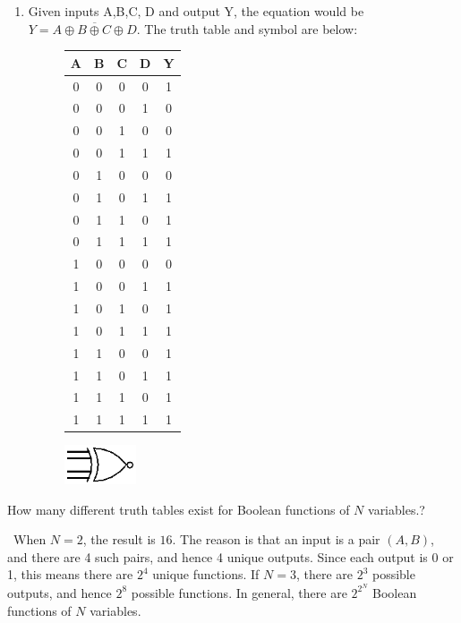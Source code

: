 \documentclass[12pt]{article}
\newenvironment{ex}[2][Exercise]{\begin{trivlist}
		\item[\hskip \labelsep {\bfseries #1}\hskip \labelsep {\bfseries #2.}]}{\end{trivlist}}
\newenvironment{sol}[1][Solution]{\begin{trivlist}
		\item[\hskip \labelsep {\bfseries #1:}]}{\end{trivlist}}
\begin{document}
\begin{sol}
\begin{enumerate}[label=(\alph*)]
		\item Given inputs A,B,C, D and output Y, the equation would be $Y=\overline{A\oplus B\oplus C \oplus D}$. The truth table and symbol are below:
		\begin{figure}[h]
			\centering
			\begin{tabular}{|cccc|c|}
				\hline
				A & B & C & D &Y \\
				\hline
				0 & 0 & 0 & 0 & 1 \\
				0 & 0 & 0 & 1 & 0 \\
				0 & 0 & 1 & 0 & 0 \\
				0 & 0 & 1 & 1 & 1 \\
				0 & 1 & 0 & 0 & 0 \\
				0 & 1 & 0 & 1 & 1 \\
				0 & 1 & 1 & 0 & 1 \\
				0 & 1 & 1 & 1 & 1 \\
				1 & 0 & 0 & 0 & 0 \\
				1 & 0 & 0 & 1 & 1 \\
				1 & 0 & 1 & 0 & 1 \\
				1 & 0 & 1 & 1 & 1 \\
				1 & 1 & 0 & 0 & 1 \\
				1 & 1 & 0 & 1 & 1 \\
				1 & 1 & 1 & 0 & 1 \\
				1 & 1 & 1 & 1 & 1 \\
				\hline
			\end{tabular}
			\quad\quad
			\includegraphics[width=0.2\textwidth]{xnor-gate-4-inputs}
		\end{figure}
	\end{enumerate}
\end{sol}

\begin{ex}{1.77}
	How many different truth tables exist for Boolean functions of $N$ variables.?
\end{ex}

\begin{sol}\
	When $N=2$, the result is $16$. The reason is that an input is a pair $(A, B)$, and there are 4 such pairs, and hence 4 unique outputs. Since each output is 0 or 1, this means there are $2^4$ unique functions. If $N=3$, there are $2^{3}$ possible outputs, and hence $2^{8}$ possible functions. In general, there are $2^{2^N}$ Boolean functions of $N$ variables.
\end{sol}
\end{document}
